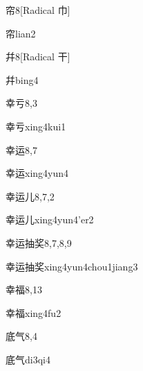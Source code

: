 \begin{entry}{帘}{8}[Radical 巾]
  \begin{phonetics}{帘}{lian2}
  \end{phonetics}
\end{entry}

\begin{entry}{幷}{8}[Radical 干]
  \begin{phonetics}{幷}{bing4}
  \end{phonetics}
\end{entry}

\begin{entry}{幸亏}{8,3}
  \begin{phonetics}{幸亏}{xing4kui1}
  \end{phonetics}
\end{entry}

\begin{entry}{幸运}{8,7}
  \begin{phonetics}{幸运}{xing4yun4}
  \end{phonetics}
\end{entry}

\begin{entry}{幸运儿}{8,7,2}
  \begin{phonetics}{幸运儿}{xing4yun4'er2}
  \end{phonetics}
\end{entry}

\begin{entry}{幸运抽奖}{8,7,8,9}
  \begin{phonetics}{幸运抽奖}{xing4yun4chou1jiang3}
  \end{phonetics}
\end{entry}

\begin{entry}{幸福}{8,13}
  \begin{phonetics}{幸福}{xing4fu2}
  \end{phonetics}
\end{entry}

\begin{entry}{底气}{8,4}
  \begin{phonetics}{底气}{di3qi4}
  \end{phonetics}
\end{entry}


